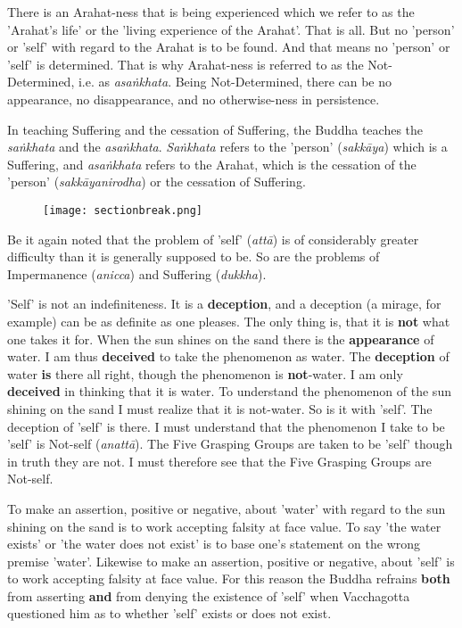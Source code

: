 There is an Arahat-ness that is being experienced which we refer to as
the 'Arahat’s life' or the 'living experience of the Arahat'. That is
all. But no 'person' or 'self' with regard to the Arahat is to be found.
And that means no 'person' or 'self' is determined. That is why
Arahat-ness is referred to as the Not-Determined, i.e. as
\emph{asaṅkhata}. Being Not-Determined, there can be no appearance, no
disappearance, and no otherwise-ness in persistence.


In teaching Suffering and the cessation of Suffering, the Buddha teaches
the \emph{saṅkhata} and the \emph{asaṅkhata}. \emph{Saṅkhata} refers to the 'person'
(\emph{sakkāya}) which is a Suffering, and \emph{asaṅkhata} refers to the
Arahat, which is the cessation of the 'person' (\emph{sakkāyanirodha}) or
the cessation of Suffering.


\begin{figure}[h]{}
\centering\texttt{[image: sectionbreak.png]}


\end{figure}

Be it again noted that the problem of 'self' (\emph{attā}) is of
considerably greater difficulty than it is generally supposed to be. So
are the problems of Impermanence (\emph{anicca}) and Suffering
(\emph{dukkha}).


'Self' is not an indefiniteness. It is a \textbf{deception}, and a deception
(a mirage, for example) can be as definite as one pleases. The only
thing is, that it is \textbf{not} what one takes it for. When the sun shines on
the sand there is the \textbf{appearance} of water. I am thus \textbf{deceived} to
take the phenomenon as water. The \textbf{deception} of water \textbf{is} there all
right, though the phenomenon is \textbf{not}-water. I am only \textbf{deceived} in
thinking that it is water. To understand the phenomenon of the sun
shining on the sand I must realize that it is not-water. So is it with
'self'. The deception of 'self' is there. I must understand that the
phenomenon I take to be 'self' is Not-self (\emph{anattā}). The Five
Grasping Groups are taken to be 'self' though in truth they are not. I
must therefore see that the Five Grasping Groups are Not-self.


To make an assertion, positive or negative, about 'water' with regard to
the sun shining on the sand is to work accepting falsity at face value.
To say 'the water exists' or 'the water does not exist' is to base one’s
statement on the wrong premise 'water'. Likewise to make an assertion,
positive or negative, about 'self' is to work accepting falsity at face
value. For this reason the Buddha refrains \textbf{both} from asserting \textbf{and}
from denying the existence of 'self' when Vacchagotta questioned him as
to whether 'self' exists or does not exist.


